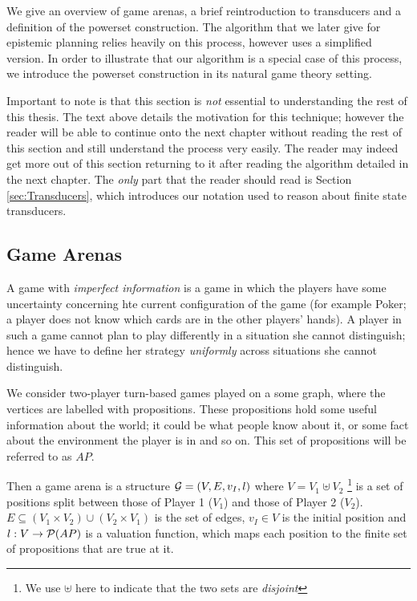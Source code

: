 \documentclass[10pt, a4paper]{report}
\begin{document}
We give an overview of game arenas, a brief reintroduction to transducers and
a definition of the powerset construction. The algorithm that we later give for
epistemic planning relies heavily on this process, however uses a simplified
version. In order to illustrate that our algorithm is a special case of this
process, we introduce the powerset construction in its natural game theory
setting. 

Important to note is that this section is \emph{not} essential to understanding
the rest of this thesis. The text above details the motivation for this
technique; however the reader will be able to continue onto the next chapter
without reading the rest of this section and still understand the process very
easily. The reader may indeed get more out of this section returning to it after
reading the algorithm detailed in the next chapter. The \emph{only} part that
the reader should read is Section \ref{sec:Transducers}, which introduces our
notation used to reason about finite state transducers.

\subsection{Game Arenas}

A game with \emph{imperfect information} is a game in which the players have
some uncertainty concerning hte current configuration of the game (for example
Poker; a player does not know which cards are in the other players' hands). A
player in such a game cannot plan to play differently in a situation she cannot
distinguish; hence we have to define her strategy \emph{uniformly} across
situations she cannot distinguish. 

We consider two-player turn-based games played on a some graph, where the
vertices are labelled with propositions. These propositions hold some useful
information about the world; it could be what people know about it, or some fact
about the environment the player is in and so on. This set of propositions will
be referred to as $AP$. 

Then a game arena is a structure $\mathcal{G} = (V, E, v_I, l)$ where $V = V_1 \uplus
V_2$ \footnote{We use $\uplus$ here to indicate that the two sets are
  \emph{disjoint}} is a set of positions split between those of Player 1 ($V_1$)
and those of Player 2 ($V_2$). $E \subseteq (V_1 \times V_2) \cup (V_2 \times
V_1)$ is the set of edges, $v_I \in V$ is the initial position and $l : V
\rightarrow \mathcal{P}(AP)$ is a valuation function, which maps each position to the
finite set of propositions that are true at it.
\end{document}
